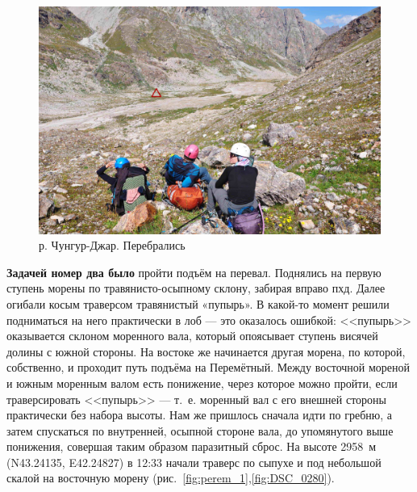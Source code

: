 \begin{figure}[h!]
	\centering
	\includegraphics[width=0.7\linewidth]{../pics/DSC_0277.jpg}
	\caption{р. Чунгур-Джар. Перебрались}
	\label{fig:DSC_0277}
\end{figure}


\textbf{Задачей номер два было} пройти подъём на перевал. Поднялись на первую ступень морены по травянисто-осыпному склону, забирая вправо пхд. Далее огибали косым траверсом травянистый «пупырь». В какой-то момент решили подниматься на него практически в лоб --- это оказалось ошибкой: <<пупырь>> оказывается склоном моренного вала, который опоясывает ступень висячей долины с южной стороны. На востоке же начинается другая морена, по которой, собственно, и проходит путь подъёма на Перемётный. Между восточной мореной и южным моренным валом есть понижение, через которое можно пройти, если траверсировать <<пупырь>> --- т.~е. моренный вал с его внешней стороны практически без набора высоты. Нам же пришлось сначала идти по гребню, а затем спускаться по внутренней, осыпной стороне вала, до упомянутого выше понижения, совершая таким образом паразитный сброс. На высоте 2958~м (N43.24135\degree, E42.24827\degree) в 12:33  начали траверс по сыпухе и под небольшой скалой на восточную морену (рис.~\ref{fig:perem_1},\ref{fig:DSC_0280}).

